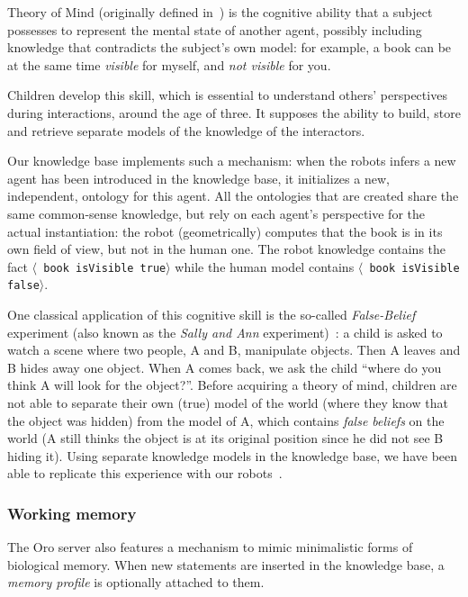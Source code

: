 \documentclass[preprint,5p]{elsarticle}
\newcommand{\stmt}[1]{{\footnotesize \tt $\langle$ #1\relax$\rangle$}}
\begin{document}
Theory of Mind (originally defined in~\cite{Premack1978}) is the cognitive
ability that a subject possesses to represent the mental state of another
agent, possibly including knowledge that contradicts the subject's own model: for
example, a book can be at the same time \emph{visible} for myself, and \emph{not
visible} for you.

Children develop this skill, which is essential to understand others' perspectives during
interactions, around the age of three. It supposes the
ability to build, store and retrieve separate models of the knowledge of the
interactors.

Our knowledge base implements such a mechanism: when the robots infers a new
agent has been introduced in the knowledge base, it initializes a new,
independent, ontology for this agent. All the ontologies that are created share
the same common-sense knowledge, but rely on each agent's perspective for the
actual instantiation: the robot (geometrically) computes that the book is in
its own field of view, but not in the human one. The robot knowledge contains
the fact \stmt{book isVisible true} while the human model contains \stmt{book
isVisible false}.

One classical application of this cognitive skill is the so-called
\emph{False-Belief} experiment (also known as the \emph{Sally and Ann}
experiment)~\cite{Leslie2000}: a child is asked to watch a scene where two
people, A and B, manipulate objects. Then A leaves and B hides away one
object. When A comes back, we ask the child ``where do you think A will
look for the object?''. Before acquiring a theory of mind, children are not
able to separate their own (true) model of the world (where they know that
the object was hidden) from the model of A, which contains \emph{false
beliefs} on the world (A still thinks the object is at its original
position since he did not see B hiding it). Using separate knowledge models
in the knowledge base, we have been able to replicate this experience with
our robots~\cite{warnier2012when}.

\subsubsection{Working memory}

The {\sc Oro} server also features a mechanism to mimic minimalistic forms of
biological memory.  When new statements are inserted in the knowledge base, a
\emph{memory profile} is optionally attached to them.
\end{document}
